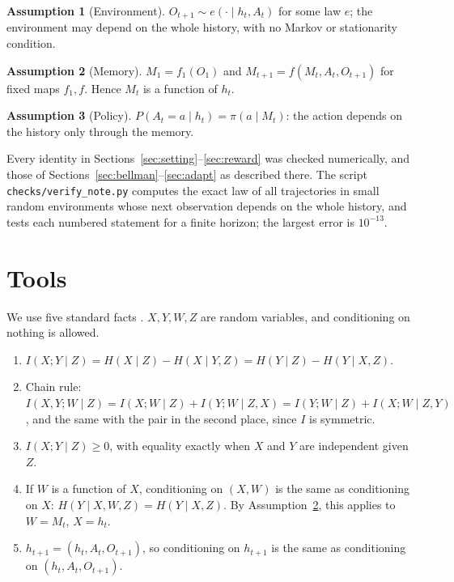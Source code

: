 \documentclass{article}
\theoremstyle{definition}
\newtheorem{assumption}{Assumption}
\theoremstyle{remark}
\begin{document}
\begin{assumption}[Environment]\label{as:env}
$O_{t+1}\sim e(\cdot\mid h_t,A_t)$ for some law $e$; the environment may depend on the whole history, with no Markov or stationarity condition.
\end{assumption}

\begin{assumption}[Memory]\label{as:mem}
$M_1=f_1(O_1)$ and $M_{t+1}=f(M_t,A_t,O_{t+1})$ for fixed maps $f_1,f$. Hence $M_t$ is a function of $h_t$.
\end{assumption}

\begin{assumption}[Policy]\label{as:pol}
$P(A_t=a\mid h_t)=\pi(a\mid M_t)$: the action depends on the history only through the memory.
\end{assumption}

Every identity in Sections~\ref{sec:setting}--\ref{sec:reward} was checked numerically, and those of Sections~\ref{sec:bellman}--\ref{sec:adapt} as described there. The script \texttt{checks/verify\_note.py} computes the exact law of all trajectories in small random environments whose next observation depends on the whole history, and tests each numbered statement for a finite horizon; the largest error is $10^{-13}$.

\section{Tools}\label{sec:tools}

We use five standard facts \citep[Ch.~2]{cover2006elements}. $X,Y,W,Z$ are random variables, and conditioning on nothing is allowed.
\begin{enumerate}
\item[(T1)] $I(X;Y\mid Z)=H(X\mid Z)-H(X\mid Y,Z)=H(Y\mid Z)-H(Y\mid X,Z)$.
\item[(T2)] Chain rule: $I(X,Y;W\mid Z)=I(X;W\mid Z)+I(Y;W\mid Z,X)=I(Y;W\mid Z)+I(X;W\mid Z,Y)$, and the same with the pair in the second place, since $I$ is symmetric.
\item[(T3)] $I(X;Y\mid Z)\ge0$, with equality exactly when $X$ and $Y$ are independent given $Z$.
\item[(T4)] If $W$ is a function of $X$, conditioning on $(X,W)$ is the same as conditioning on $X$: $H(Y\mid X,W,Z)=H(Y\mid X,Z)$. By Assumption~\ref{as:mem}, this applies to $W=M_t$, $X=h_t$.
\item[(T5)] $h_{t+1}=(h_t,A_t,O_{t+1})$, so conditioning on $h_{t+1}$ is the same as conditioning on $(h_t,A_t,O_{t+1})$.
\end{enumerate}
\end{document}
